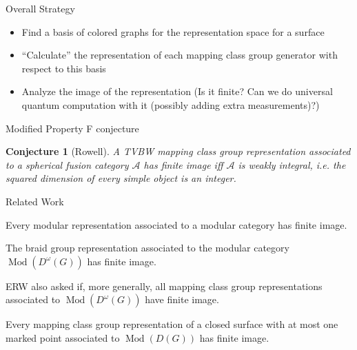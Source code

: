 \documentclass{beamer}
\DeclareMathOperator{\Mod}{Mod}
\newtheorem{conj}[theorem]{Conjecture}
\begin{document}
\begin{frame}{Overall Strategy}
\begin{itemize}
\item Find a basis of colored graphs for the representation space for a surface
\item ``Calculate'' the representation of each mapping class group generator with respect to this basis
\item Analyze the image of the representation (Is it finite? Can we do universal quantum computation with it (possibly adding extra measurements)?)
\end{itemize}
\end{frame}

\begin{frame}{Modified Property F conjecture}
\begin{conj}[Rowell]
A TVBW mapping class group representation associated to a spherical fusion category $\mathcal A$ has finite image iff $\mathcal A$ is weakly integral, i.e. the squared dimension of every simple object is an integer.
\end{conj}

\end{frame}

\begin{frame}{Related Work}


\begin{theorem}[Ng--Schauenberg]
Every modular representation associated to a modular category has finite image.
\end{theorem}

\pause


\begin{theorem}
The braid group representation associated to 
the modular category $\Mod(D^\omega(G))$ has finite image.
\end{theorem}

\pause


 ERW also asked if, more generally, all mapping class group representations associated to $\Mod(D^\omega(G))$ have finite image.  

\pause

\begin{theorem}
Every mapping class group representation of a closed surface with at most one marked point associated to $\Mod(D(G))$ has finite image.
\end{theorem}

\end{frame}
\end{document}
